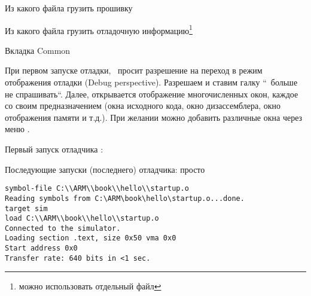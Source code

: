 


Из какого файла грузить прошивку


Из какого файла грузить отладочную информацию\footnote{можно использовать
отдельный  файл}



\bigskip
Вкладка Common

\bigskip





% 

\bigskip
При первом запуске отладки, \eclipse\ просит разрешение на переход в режим
отображения отладки (Debug perspective). Разрешаем и ставим галку “\checkbox\
больше не спрашивать“. Далее, открывается отображение многочисленных окон,
каждое со своим предназначением (окна исходного кода, окно дизассемблера, окно
отображения памяти и т.д.). При желании можно добавить различные окна через меню
\menu{Window>Show View}.

\bigskip

Первый запуск отладчика \bug: 

Последующие запуски (последнего) отладчика: просто  

\bigskip
\begin{lstlisting}
symbol-file C:\\ARM\\book\\hello\\startup.o
Reading symbols from C:\ARM\book\hello\startup.o...done.
target sim
load C:\\ARM\\book\\hello\\startup.o 
Connected to the simulator.
Loading section .text, size 0x50 vma 0x0
Start address 0x0
Transfer rate: 640 bits in <1 sec.
\end{lstlisting}

